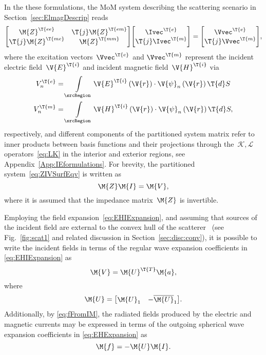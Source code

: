 \documentclass[journal]{IEEEtran}
\providecommand{\Umat}{\M{U}} %
\providecommand{\Ie}{\Ivec^{\T{e}}} %
\renewcommand{\Im}{\Ivec^{\T{m}}} %
\providecommand{\Ve}{\Vvec^{\T{e}}} %
\providecommand{\Vm}{\Vvec^{\T{m}}} %
\providecommand{\Ei}{\V{E}^{\T{i}}} %
\providecommand{\Hi}{\V{H}^{\T{i}}} %
\begin{document}
In the these formulations, the \ac{MoM} system describing the scattering scenario in Section~\ref{sec:ElmagDescrip} reads~\cite{ChangHarrington_AsurfaceFormulationForCharacteristicModesOfMaterialBodies}
\begin{equation}
\label{eq:ZIVSurfEqv}
\mqty[
\M{Z}^\T{ee}& \T{j} \M{Z}^\T{em}\\
\T{j} \M{Z}^\T{me}&\M{Z}^\T{mm}
]
\mqty[\Ie\\\T{j}\Im] = 
\mqty[\Ve\\ \T{j} \Vm],
\end{equation}
where the excitation vectors~$\Ve$ and $\Vm$ represent the incident electric field~$\Ei$ and incident magnetic field~$\Hi$ via
\begin{equation}
\begin{aligned}
    \label{eq:V}
    V^\T{e}_n &= \int \limits_{\srcRegion} \Ei\left( \V{r} \right)  \cdot \V{\psi}_n \left( \V{r} \right) \T{d}S \\
    V^\T{m}_n &= \int \limits_{\srcRegion} \Hi\left( \V{r} \right) \cdot \V{\psi}_n \left( \V{r} \right) \T{d}S,
\end{aligned}
\end{equation}
respectively, and different components of the partitioned system matrix refer to inner products between basis functions and their projections through the~$\mathcal{K},\mathcal{L}$ operators~\eqref{eq:LK} in the interior and exterior regions, see Appendix~\ref{App:IEformulations}. For brevity, the partitioned system~\eqref{eq:ZIVSurfEqv} is written as
\begin{equation}
\label{eq:ZIVsimple}
\M{Z} \M{I} = \M{V},
\end{equation}
where it is assumed that the impedance matrix~$\M{Z}$ is invertible.

Employing the field expansion~\eqref{eq:EHIExpansion}, and assuming that sources of the incident field are external to the convex hull of the scatterer~\cite{Mishchenko+etal2000} (see Fig.~\ref{fig:scat1} and related discussion in Section~\ref{sec:disc:conv}), it is  possible to write the incident fields in terms of the regular wave expansion coefficients in \eqref{eq:EHIExpansion} as
\begin{equation}
\label{eq:VWvecSW}
\M{V} = \Umat^\T{T} \M{a},
\end{equation}
where
\begin{equation}
\label{eq:UmatSimple}
\Umat = \mqty[\Umat_1 & - \overline{\Umat}_1 ].
\end{equation}
Additionally, by \eqref{eq:fFromIM}, the radiated fields produced by the electric and magnetic currents may be expressed in terms of the outgoing spherical wave expansion coefficients in \eqref{eq:EHExpansion} as
\begin{equation}
\label{eq:fTot}
\M{f} = - \Umat \M{I}.
\end{equation}
\end{document}
